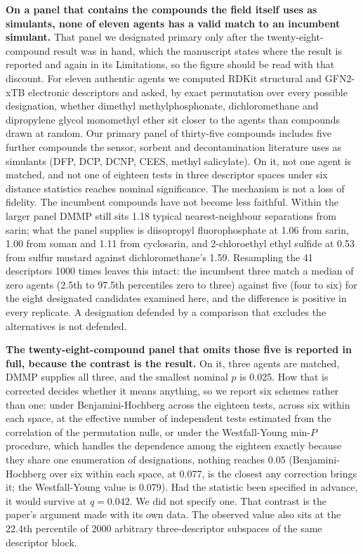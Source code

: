 \documentclass[11pt,a4paper]{article}
\begin{document}
\textbf{On a panel that contains the compounds the field itself uses as
simulants, none of eleven agents has a valid match to an incumbent simulant.}
That panel we designated primary only after the twenty-eight-compound result
was in hand, which the manuscript states where the result is reported and
again in its Limitations, so the figure should be read with that discount.
For eleven authentic agents we computed RDKit structural and GFN2-xTB electronic
descriptors and asked, by exact permutation over every possible designation,
whether dimethyl methylphosphonate, dichloromethane and dipropylene glycol
monomethyl ether sit closer to the agents than compounds drawn at random. Our
primary panel of thirty-five compounds includes five further compounds the
sensor, sorbent and decontamination literature uses as simulants (DFP, DCP,
DCNP, CEES, methyl salicylate). On it, not one agent is matched, and not one of
eighteen tests in three descriptor spaces under six distance statistics reaches
nominal significance. The mechanism is not a loss of fidelity. The incumbent compounds have not become
less faithful. Within the larger panel DMMP still sits 1.18 typical
nearest-neighbour separations from sarin; what the panel supplies is
diisopropyl fluorophosphate at 1.06 from sarin, 1.00 from soman and 1.11 from
cyclosarin, and 2-chloroethyl ethyl sulfide at 0.53 from sulfur mustard against
dichloromethane's 1.59. Resampling the 41 descriptors 1000 times leaves this
intact: the incumbent three match a median of zero agents (2.5th to 97.5th
percentiles zero to three) against five (four to six) for the eight designated
candidates
examined here, and
the difference is positive in every replicate. A designation defended by a
comparison that excludes the alternatives is not defended.

\textbf{The twenty-eight-compound panel that omits those five is reported in
full, because the contrast is the result.} On it, three agents are matched, DMMP
supplies all three, and the smallest nominal $p$ is 0.025. How that is corrected
decides whether it means anything, so we report six schemes rather than one:
under Benjamini-Hochberg across the eighteen tests, across six within each
space, at the effective number of independent tests estimated from the
correlation of the permutation nulls, or under the Westfall-Young min-$P$
procedure, which handles the dependence among the eighteen exactly because they
share one enumeration of designations, nothing reaches 0.05 (Benjamini-Hochberg
over six within each space, at 0.077, is the closest any correction brings it;
the Westfall-Young value is 0.079). Had the statistic
been specified in advance, it would survive at $q=0.042$. We did not specify one.
That contrast is the paper's argument made with its own data. The observed value
also sits at the 22.4th percentile of 2000 arbitrary three-descriptor subspaces
of the same descriptor block.
\end{document}
